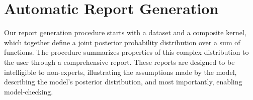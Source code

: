 \documentclass{article} %
\begin{document}

\section{Automatic Report Generation}
\label{sec:method}
\vspace{-0.08in}

Our report generation procedure starts with a dataset and a composite kernel, which together define a joint posterior probability distribution over a sum of functions.
The procedure summarizes properties of this complex distribution to the user through a comprehensive report.
%
These reports are designed to be intelligible to non-experts, illustrating the assumptions made by the model, describing the model's posterior distribution, and most importantly, enabling model-checking.
%
%
%
%
%
\end{document}
